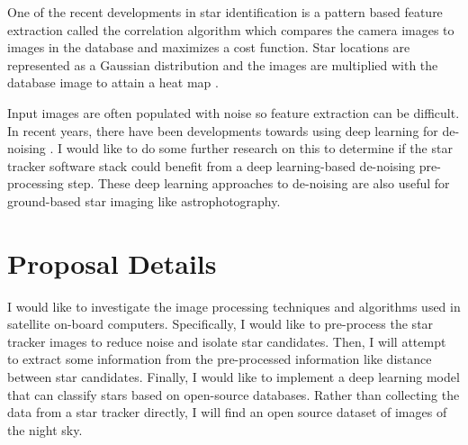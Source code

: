 \documentclass[a4paper]{article}
\begin{document}
One of the recent developments in star identification is a pattern based feature extraction called the correlation algorithm which compares the camera images to images in the database and maximizes a cost function. Star locations are represented as a Gaussian distribution and the images are multiplied with the database image to attain a heat map \cite{survey}.

Input images are often populated with noise so feature extraction can be difficult. In recent years, there have been developments towards using deep learning for de-noising \cite{denoise}. I would like to do some further research on this to determine if the star tracker software stack could benefit from a deep learning-based de-noising pre-processing step. These deep learning approaches to de-noising are also useful for ground-based star imaging like astrophotography.



\section{Proposal Details}

I would like to investigate the image processing techniques and algorithms used in satellite on-board computers. Specifically, I would like to pre-process the star tracker images to reduce noise and isolate star candidates. Then, I will attempt to extract some information from the pre-processed information like distance between star candidates. Finally, I would like to implement a deep learning model that can classify stars based on open-source databases. Rather than collecting the data from a star tracker directly, I will find an open source dataset of images of the night sky.



\end{document}

